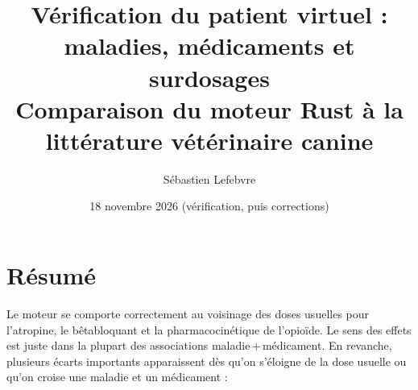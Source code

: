 \documentclass[10pt,a4paper]{article}
\title{Vérification du patient virtuel : maladies, médicaments et surdosages\\[0.3em]
\large Comparaison du moteur Rust à la littérature vétérinaire canine}
\author{Sébastien Lefebvre}
\date{18 novembre 2026 (vérification, puis corrections)}
\begin{document}
\sloppy
\maketitle

\begin{center}
\end{center}

\section*{Résumé}

Le moteur se comporte correctement au voisinage des doses usuelles pour l'atropine, le bêtabloquant et la pharmacocinétique de l'opioïde. Le sens des effets est juste dans la plupart des associations maladie\,+\,médicament. En revanche, plusieurs écarts importants apparaissent dès qu'on s'éloigne de la dose usuelle ou qu'on croise une maladie et un médicament :
\end{document}
